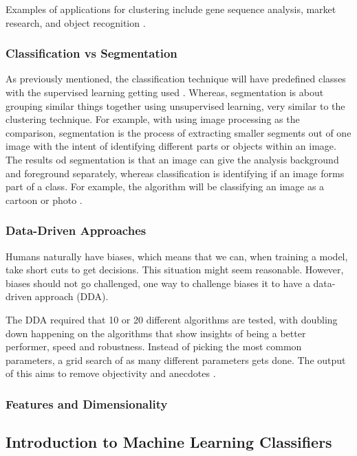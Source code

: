 \documentclass[a4paper,10pt]{article}
\begin{document}
Examples of applications for clustering include gene sequence analysis, market research, and object recognition \cite{matlanintrotoml}.

\subsubsection{Classification vs Segmentation}
As previously mentioned, the classification technique will have predefined classes with the supervised learning getting used \cite{poole2010artificial}. Whereas, segmentation is about grouping similar things together using unsupervised learning, very similar to the clustering technique. For example, with using image processing as the comparison, segmentation is the process of extracting smaller segments out of one image with the intent of identifying different parts or objects within an image. The results od segmentation is that an image can give the analysis background and foreground separately, whereas classification is identifying if an image forms part of a class. For example, the algorithm will be classifying an image as a cartoon or photo \cite{quorasegclusdiff}. 

\subsubsection{Data-Driven Approaches}
Humans naturally have biases, which means that we can, when training a model, take short cuts to get decisions. This situation might seem reasonable. However, biases should not go challenged, one way to challenge biases it to have a data-driven approach (DDA). 

The DDA required that 10 or 20 different algorithms are tested, with doubling down happening on the algorithms that show insights of being a better performer, speed and robustness. Instead of picking the most common parameters, a grid search of as many different parameters gets done. The output of this aims to remove objectivity and anecdotes \cite{DDA}.
\subsubsection{Features and Dimensionality}

\subsection{Introduction to Machine Learning Classifiers}
\end{document}

